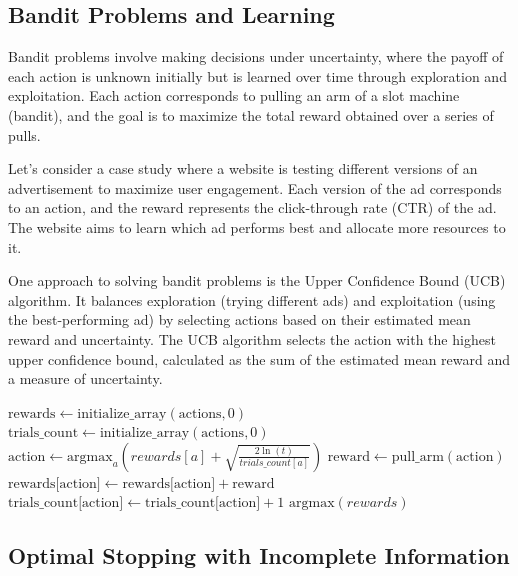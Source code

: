 \documentclass[12pt]{book} %
\begin{document}
\subsection{Bandit Problems and Learning}

Bandit problems involve making decisions under uncertainty, where the payoff of each action is unknown initially but is learned over time through exploration and exploitation. Each action corresponds to pulling an arm of a slot machine (bandit), and the goal is to maximize the total reward obtained over a series of pulls.

Let's consider a case study where a website is testing different versions of an advertisement to maximize user engagement. Each version of the ad corresponds to an action, and the reward represents the click-through rate (CTR) of the ad. The website aims to learn which ad performs best and allocate more resources to it.

One approach to solving bandit problems is the Upper Confidence Bound (UCB) algorithm. It balances exploration (trying different ads) and exploitation (using the best-performing ad) by selecting actions based on their estimated mean reward and uncertainty. The UCB algorithm selects the action with the highest upper confidence bound, calculated as the sum of the estimated mean reward and a measure of uncertainty.
\FloatBarrier
\begin{algorithm}
\caption{Upper Confidence Bound (UCB) Algorithm}\label{ucb}
\begin{algorithmic}[1]
\State $\text{rewards} \gets \text{initialize\_array}(\text{actions}, 0)$
\State $\text{trials\_count} \gets \text{initialize\_array}(\text{actions}, 0)$
    \State $\text{action} \gets \text{argmax}_{a}(rewards[a] + \sqrt{\frac{2\ln(t)}{trials\_count[a]}})$
    \State $\text{reward} \gets \text{pull\_arm}(\text{action})$
    \State $\text{rewards[action]} \gets \text{rewards[action]} + \text{reward}$
    \State $\text{trials\_count[action]} \gets \text{trials\_count[action]} + 1$
\EndFor
\State \Return $\text{argmax}(rewards)$
\EndFunction
\end{algorithmic}
\end{algorithm}
\FloatBarrier


\subsection{Optimal Stopping with Incomplete Information}
\end{document}
